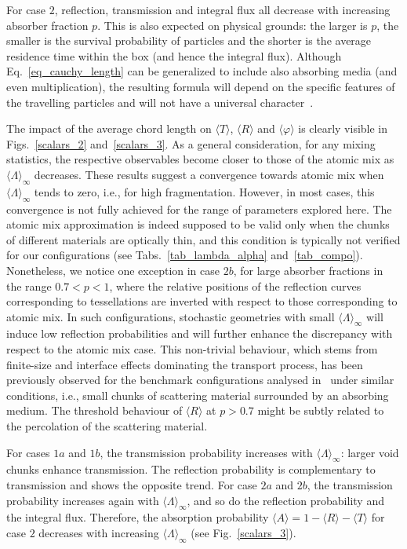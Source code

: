 \documentclass[final,authoryear,5p,times,twocolumn]{elsarticle}
\begin{document}
For case $2$, reflection, transmission and integral flux all decrease with increasing absorber fraction $p$. This is also expected on physical grounds: the larger is $p$, the smaller is the survival probability of particles and the shorter is the average residence time within the box (and hence the integral flux). Although Eq.~\eqref{eq_cauchy_length} can be generalized to include also absorbing media (and even multiplication), the resulting formula will depend on the specific features of the travelling particles and will not have a universal character~\cite{zoia_cauchy_1, zoia_cauchy_2, zoia_cauchy_3}.

The impact of the average chord length on $\langle T \rangle$, $\langle R \rangle$ and $\langle \varphi \rangle$ is clearly visible in Figs.~\ref{scalars_2} and~\ref{scalars_3}. As a general consideration, for any mixing statistics, the respective observables become closer to those of the atomic mix as ${\langle \Lambda \rangle}_{\infty}$ decreases. These results suggest a convergence towards atomic mix when ${\langle \Lambda \rangle}_{\infty}$ tends to zero, i.e., for high fragmentation. However, in most cases, this convergence is not fully achieved for the range of parameters explored here. The atomic mix approximation is indeed supposed to be valid only when the chunks of different materials are optically thin, and this condition is typically not verified for our configurations (see Tabs.~\ref{tab_lambda_alpha} and~\ref{tab_compo}). Nonetheless, we notice one exception in case $2b$, for large absorber fractions in the range $0.7 < p <1$, where the relative positions of the reflection curves corresponding to tessellations are inverted with respect to those corresponding to atomic mix. In such configurations, stochastic geometries with small ${\langle \Lambda \rangle}_{\infty}$ will induce low reflection probabilities and will further enhance the discrepancy with respect to the atomic mix case. This non-trivial behaviour, which stems from finite-size and interface effects dominating the transport process, has been previously observed for the benchmark configurations analysed in~\cite{larmier_benchmark} under similar conditions, i.e., small chunks of scattering material surrounded by an absorbing medium. The threshold behaviour of $\langle R \rangle$ at $p>0.7$ might be subtly related to the percolation of the scattering material.

For cases $1a$ and $1b$, the transmission probability increases with ${\langle \Lambda \rangle}_{\infty}$: larger void chunks enhance transmission. The reflection probability is complementary to transmission and shows the opposite trend. For case $2a$ and $2b$, the transmission probability increases again with ${\langle \Lambda \rangle}_{\infty}$, and so do the reflection probability and the integral flux. Therefore, the absorption probability $\langle A \rangle = 1-\langle R\rangle-\langle T\rangle$ for case $2$ decreases with increasing ${\langle \Lambda \rangle}_{\infty}$ (see Fig.~\ref{scalars_3}).
\end{document}
